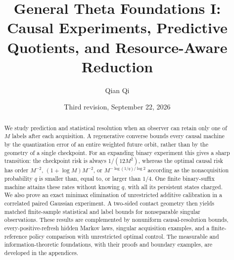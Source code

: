 
\title[General Theta Foundations I]{General Theta Foundations I: Causal Experiments, Predictive Quotients, and Resource-Aware Reduction}
\author{Qian Qi}
\date{Third revision, September 22, 2026}

\begin{abstract}
We study prediction and statistical resolution when an observer can retain
only one of $M$ labels after each acquisition. A regenerative converse
bounds every causal machine by the quantization error of an entire weighted
future orbit, rather than by the geometry of a single checkpoint. For an
expanding binary experiment this gives a sharp transition: the checkpoint
risk is always $1/(12M^2)$, whereas the optimal causal risk has order
$M^{-2}$, $(1+\log M)M^{-2}$, or $M^{-\log(1/q)/\log2}$ according as
the nonacquisition probability $q$ is smaller than, equal to, or larger
than $1/4$. One finite binary-suffix machine attains these rates without
knowing $q$, with all its persistent states charged. We also prove an
exact minimax elimination of unrestricted additive calibration in a
correlated paired Gaussian experiment. A two-sided contact geometry then
yields matched finite-sample statistical and label bounds for nonseparable
singular observations. These results are complemented by nonuniform
causal-resolution bounds, every-positive-refresh hidden Markov laws,
singular acquisition examples, and a finite-reference policy comparison
with unrestricted optimal control. The measurable and information-theoretic
foundations, with their proofs and boundary examples, are developed in
the appendices.
\end{abstract}
\maketitle
\tableofcontents




\appendix
